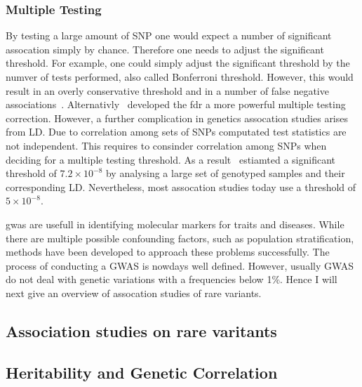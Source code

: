\subsubsection{Multiple Testing}
\label{ssub:multiple_testing}
By testing a large amount of SNP one would expect a number of significant assocation simply by chance.
Therefore one needs to adjust the significant threshold.
For example, one could simply adjust the significant threshold by the numver of tests performed, also called Bonferroni threshold.
However, this would result in an overly conservative threshold and in a number of false negative associations~\cite{Benjamini1995}.
Alternativly~\citet{Benjamini1995} developed the \acrfull{fdr} a more powerful multiple testing correction. 
However, a further complication in genetics assocation studies arises from LD\@.
Due to correlation among sets of SNPs computated test statistics are not independent.
This requires to consinder correlation among SNPs when deciding for a multiple testing threshold.
As a result~\citet{Dudbridge2008} estiamted a significant threshold of $7.2 \times 10^{-8}$ by analysing a large set of genotyped samples and their corresponding LD\@.
Nevertheless, most assocation studies today use a threshold of $5\times 10^{-8}$. %

\acrshort{gwas} are usefull in identifying molecular markers for traits and diseases.
While there are multiple possible confounding factors, such as population stratification, methods have been developed to approach these problems successfully.
The process of conducting a GWAS is nowdays well defined.
However, usually GWAS do not deal with genetic variations with a frequencies below 1\%.
Hence I will next give an overview of assocation studies of rare variants.

\subsection{Association studies on rare varitants}
\label{sub:association_studies_on_rare_varitants}

\subsection{Heritability and Genetic Correlation}
\label{sub:heritability_and_genetic_correlation}

